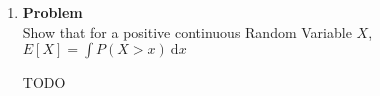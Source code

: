 \documentclass[12pt]{article}
\newenvironment{Ex}{\textbf{Problem}\vspace{.75em}\\}{}
\newcommand{\dd}[1]{\:\mathrm{d}{#1}}
\begin{document}
\begin{enumerate}
\begin{Ex}
\begin{solution}
\begin{enumerate}
\begin{multicols}{2}
\begin{equation}
\begin{aligned}
              \end{aligned}
            \end{equation}
          \end{multicols}
        \item \hfill {\huge TODO}
        \item \hfill {\huge TODO}
        \end{enumerate}
    \end{solution}
  \end{Ex}
\item
  \begin{Ex}
    Show that for a positive continuous Random Variable $X$, $E[X] =
    \int P(X > x) \dd{x}$
    \begin{solution} \hfill
      {\huge TODO}
    \end{solution}
  \end{Ex}
\end{enumerate}
\end{document}
